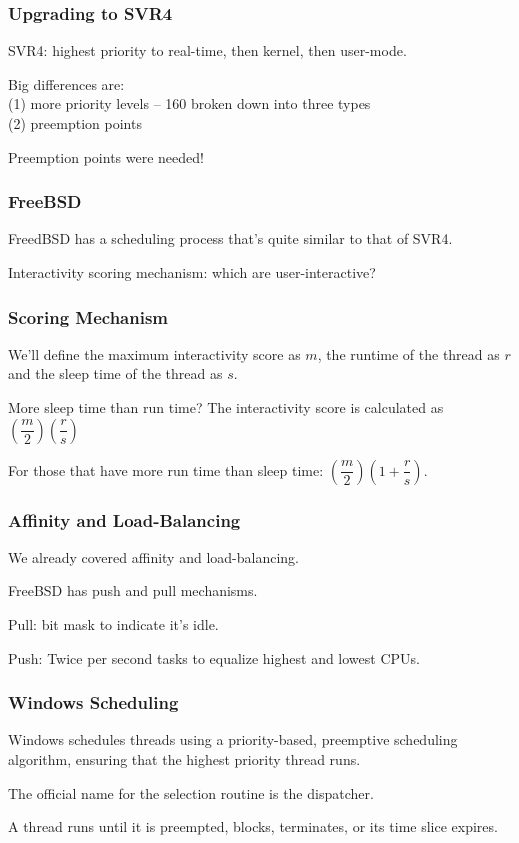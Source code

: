 \begin{frame}
\frametitle{Upgrading to SVR4}

SVR4: highest priority to real-time, then kernel, then user-mode.

Big differences are:\\
\quad (1) more priority levels -- 160 broken down into three types\\
\quad (2) preemption points

Preemption points were needed!

\end{frame}

\begin{frame}
\frametitle{FreeBSD}
FreedBSD has a scheduling process that's quite similar to that of SVR4.

Interactivity scoring mechanism: which are user-interactive?

\end{frame}

\begin{frame}
\frametitle{Scoring Mechanism}

We'll define the maximum interactivity score as $m$, the runtime of the thread as $r$ and the sleep time of the thread as $s$. 

More sleep time than run time? The interactivity score is calculated as $(\dfrac{m}{2})(\dfrac{r}{s})$

For those that have more run time than sleep time:
  $(\dfrac{m}{2})(1 + \dfrac{r}{s})$. 

\end{frame}

\begin{frame}
\frametitle{Affinity and Load-Balancing}

We already covered affinity and load-balancing.

FreeBSD has push and pull mechanisms.

Pull: bit mask to indicate it's idle.

Push: Twice per second tasks to equalize highest and lowest CPUs.


\end{frame}

\begin{frame}
\frametitle{Windows Scheduling}

Windows schedules threads using a priority-based, preemptive scheduling algorithm, ensuring that the highest priority thread runs. 

The official name for the selection routine is the \alert{dispatcher}.

A thread runs until it is preempted, blocks, terminates, or its time slice expires. 

\end{frame}

